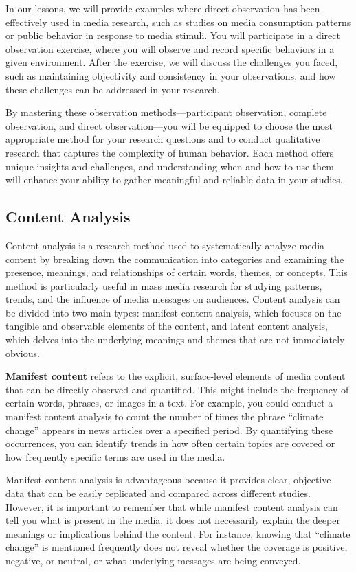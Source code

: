 \documentclass[
]{book}
\begin{document}
In our lessons, we will provide examples where direct observation has been effectively used in media research, such as studies on media consumption patterns or public behavior in response to media stimuli. You will participate in a direct observation exercise, where you will observe and record specific behaviors in a given environment. After the exercise, we will discuss the challenges you faced, such as maintaining objectivity and consistency in your observations, and how these challenges can be addressed in your research.

By mastering these observation methods---participant observation, complete observation, and direct observation---you will be equipped to choose the most appropriate method for your research questions and to conduct qualitative research that captures the complexity of human behavior. Each method offers unique insights and challenges, and understanding when and how to use them will enhance your ability to gather meaningful and reliable data in your studies.

\subsection{Content Analysis}\label{content-analysis}

Content analysis is a research method used to systematically analyze media content by breaking down the communication into categories and examining the presence, meanings, and relationships of certain words, themes, or concepts. This method is particularly useful in mass media research for studying patterns, trends, and the influence of media messages on audiences. Content analysis can be divided into two main types: manifest content analysis, which focuses on the tangible and observable elements of the content, and latent content analysis, which delves into the underlying meanings and themes that are not immediately obvious.

\textbf{Manifest content} refers to the explicit, surface-level elements of media content that can be directly observed and quantified. This might include the frequency of certain words, phrases, or images in a text. For example, you could conduct a manifest content analysis to count the number of times the phrase ``climate change'' appears in news articles over a specified period. By quantifying these occurrences, you can identify trends in how often certain topics are covered or how frequently specific terms are used in the media.

Manifest content analysis is advantageous because it provides clear, objective data that can be easily replicated and compared across different studies. However, it is important to remember that while manifest content analysis can tell you what is present in the media, it does not necessarily explain the deeper meanings or implications behind the content. For instance, knowing that ``climate change'' is mentioned frequently does not reveal whether the coverage is positive, negative, or neutral, or what underlying messages are being conveyed.
\end{document}
